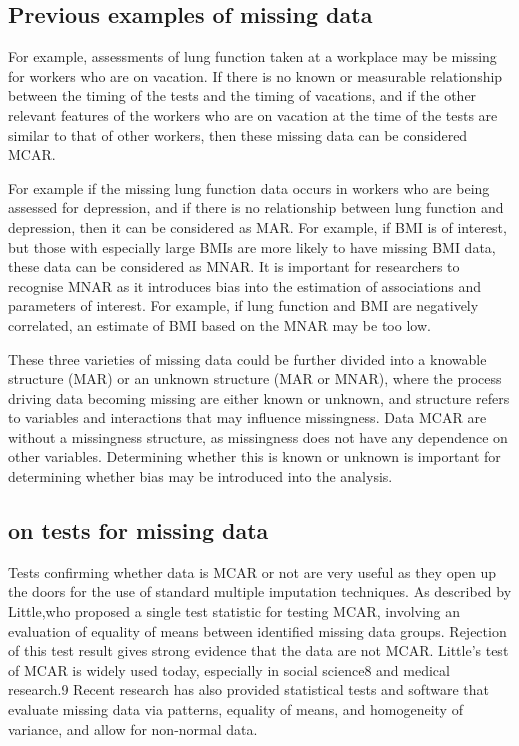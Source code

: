 \documentclass[]{article}
\begin{document}
\subsection{Previous examples of missing
data}\label{previous-examples-of-missing-data}

For example, assessments of lung function taken at a workplace may be
missing for workers who are on vacation. If there is no known or
measurable relationship between the timing of the tests and the timing
of vacations, and if the other relevant features of the workers who are
on vacation at the time of the tests are similar to that of other
workers, then these missing data can be considered MCAR.

For example if the missing lung function data occurs in workers who are
being assessed for depression, and if there is no relationship between
lung function and depression, then it can be considered as MAR. For
example, if BMI is of interest, but those with especially large BMIs are
more likely to have missing BMI data, these data can be considered as
MNAR. It is important for researchers to recognise MNAR as it introduces
bias into the estimation of associations and parameters of interest. For
example, if lung function and BMI are negatively correlated, an estimate
of BMI based on the MNAR may be too low.

These three varieties of missing data could be further divided into a
knowable structure (MAR) or an unknown structure (MAR or MNAR), where
the process driving data becoming missing are either known or unknown,
and structure refers to variables and interactions that may influence
missingness. Data MCAR are without a missingness structure, as
missingness does not have any dependence on other variables. Determining
whether this is known or unknown is important for determining whether
bias may be introduced into the analysis.

\subsection{on tests for missing data}\label{on-tests-for-missing-data}

Tests confirming whether data is MCAR or not are very useful as they
open up the doors for the use of standard multiple imputation
techniques. As described by Little,who proposed a single test statistic
for testing MCAR, involving an evaluation of equality of means between
identified missing data groups. Rejection of this test result gives
strong evidence that the data are not MCAR. Little's test of MCAR is
widely used today, especially in social science8 and medical research.9
Recent research has also provided statistical tests and software that
evaluate missing data via patterns, equality of means, and homogeneity
of variance, and allow for non-normal data.
\end{document}
